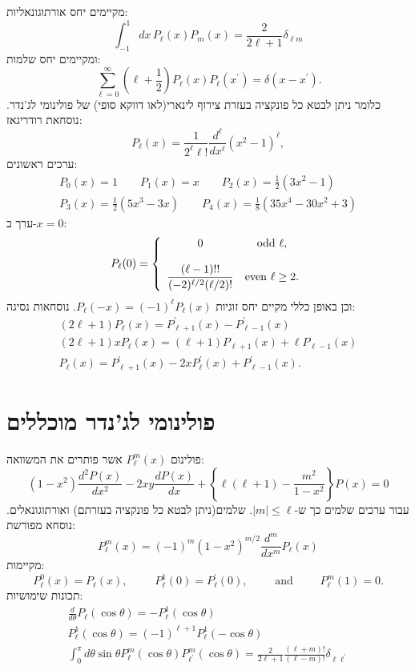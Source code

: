\documentclass{tstextbook}
\begin{document}
מקיימים יחס אורתוגונאליות:
$$\int_{-1}^{1}d x\,P_{\ell}(x)P_{m}(x)=\frac{2}{2\ell+1}\delta_{\ell m}$$
ומקיימים יחס שלמות:
$$\sum_{\ell=0}^{\infty}\left(\ell+\textstyle{\frac{1}{2}}\right)P_{\ell}(x)P_{\ell}(x^{\prime})=\delta(x-x^{\prime}).$$
כלומר ניתן לבטא כל פונקציה בעזרת צירוף לינארי(לאו דווקא סופי) של פולינומי לג'נדר.
נוסחאת רודריגאז:
$$P_{\ell}(x)={\frac{1}{2^{\ell}\ell!}}{\frac{d^{\ell}}{d x^{\ell}}}(x^{2}-1)^{\ell},$$
ערכים ראשונים:
\begin{gather*}{{P_{0}(x)=1}}\qquad  {{P_{1}(x)=x}}\qquad  {{P_{2}(x)=\displaystyle\frac{1}{2}(3x^{2}-1)}}\\ {{P_{3}(x)=\frac{1}{2}(5x^{3}-3x)}}\qquad  {{P_{4}(x)=\displaystyle\frac{1}{8}(35x^{4}-30x^{2}+3)}}\end{gather*}
ערך ב-\(x=0\):
$$P_{\ell}(0)=\left\{\begin{array}{c c}{{0}}&{{\mathrm{odd\,\,}\ell,}}\\ {{}}&{{}}\\ {{\displaystyle\frac{(\ell-1)!!}{(-2)^{\ell/2}(\ell/2)!}}}&{{\mathrm{even\,\,}\ell\ge2.}}\end{array}\right.$$
וכן באופן כללי מקיים יחס זוגיות \(P_{\ell}(-x)=(-1)^{\ell}P_{\ell}(x)\). נוסחאות נסיגה:
$$\begin{array}{c}{{(2\ell+1)P_{\ell}(x)=P_{\ell+1}^{\prime}(x)-P_{\ell-1}^{\prime}(x)}}\\ {{(2\ell+1)x P_{\ell}(x)=(\ell+1)P_{\ell+1}(x)+\ell P_{\ell-1}(x)}}\\ {{P_{\ell}(x)=P_{\ell+1}^{\prime}(x)-2x P_{\ell}^{\prime}(x)+P_{\ell-1}^{\prime}(x).}}\end{array}$$

\section{פולינומי לג'נדר מוכללים}

פולינום \(P_{\ell}^{m}(x)\) אשר פותרים את המשוואה:
$$(1-x^{2})\frac{d^{2}P(x)}{d x^{2}}-2x y\frac{d P(x)}{d x}+\left\{\ell(\ell+1)-\frac{m^{2}}{1-x^{2}}\right\}P(x)=0$$
עבור ערכים שלמים כך ש-\(\lvert m \rvert\leq \ell\). שלמים(ניתן לבטא כל פונקציה בעזרתם) ואורתוגונאלים. נוסחא מפורשת:
$$P_{\ell}^{m}(x)=(-1)^{m}(1-x^{2})^{m/2}{\frac{d^{m}}{d x^{m}}}P_{\ell}(x)$$
מקיימות:
$$P_{\ell}^{0}(x)=P_{\ell}(x),\phantom{s p a c e}P_{\ell}^{1}(0)=P_{\ell}^{\prime}(0),\phantom{s p a c e}\mathrm{and}\phantom{s p a c e}P_{\ell}^{m}(1)=0.$$
תכונות שימושיות:
\begin{gather*}\frac{d}{d\theta}P_{\ell}(\cos\theta)=-P_{\ell}^{1}(\cos\theta) \\P_{\ell}^{1}(\cos\theta)=(-1)^{\ell+1}P_{\ell}^{1}(-\cos\theta) \\\int_{0}^{\pi}d\theta\sin\theta P_{\ell}^{m}(\cos\theta)P_{\ell^{\prime}}^{m}(\cos\theta)=\frac{2}{2\ell+1}\frac{(\ell+m)!}{(\ell-m)!}\delta_{\ell\ell^{\prime}}
\end{gather*}
\end{document}
